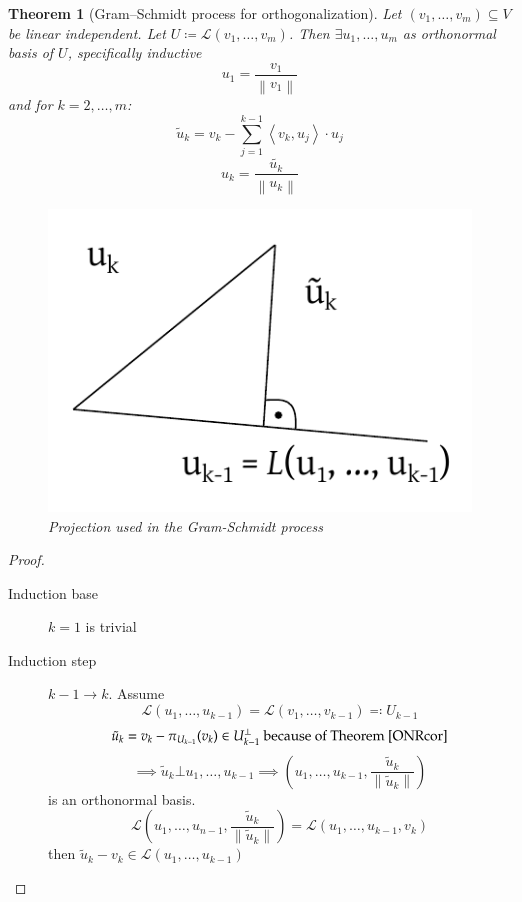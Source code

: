 \documentclass{article}
\newtheorem{theorem}{Theorem}  \numberwithin{theorem}{section}
\newcommand{\ip}[2]{\left\langle#1,#2\right\rangle} %
\newcommand{\norm}[1]{\left\|#1\right\|}
\begin{document}
\begin{theorem}[Gram–Schmidt process for orthogonalization] %
  Let $(v_1, \ldots, v_m) \subseteq V$ be linear independent.
  Let $U \coloneqq \mathcal L(v_1, \ldots, v_m)$.
  Then $\exists u_1, \ldots, u_m$ as orthonormal basis of $U$, specifically inductive
  \[ u_1 = \frac{v_1}{\norm{v_1}} \]
  and for $k = 2, \ldots, m$:
  \[ \tilde u_k = v_k - \sum_{j=1}^{k-1} \ip{v_k}{u_j} \cdot u_j \]
  \[ u_k = \frac{\tilde{u_k}}{\norm{u_k}} \]
  \begin{figure}[t]
    \begin{center}
      \includegraphics{img/12_GS_projection.pdf}
      \caption{Projection used in the Gram-Schmidt process}
      \label{GSproj}
    \end{center}
  \end{figure}
\end{theorem}

\begin{proof}
  \begin{description}
    \item[Induction base] $k=1$ is trivial
    \item[Induction step] $k-1 \to k$. Assume
      \[ \mathcal L(u_1, \ldots, u_{k-1}) = \mathcal L(v_1, \ldots, v_{k-1}) \eqqcolon U_{k-1} \]
      \[ \tilde u_k = v_k - \pi_{U_{k-1}}(v_k) \in U_{k-1}^\bot \text{ because of Theorem~\ref{ONRcor}} \]
      \[ \implies \tilde u_k \bot u_1, \ldots, u_{k-1} \implies (u_1, \ldots, u_{k-1}, \frac{\tilde u_k}{\norm{\tilde u_k}}) \]
      is an orthonormal basis.
      \[
        \mathcal L(u_1, \ldots, u_{n-1}, \frac{\tilde u_k}{\norm{\tilde u_k}})
          = \mathcal L(u_1, \ldots, u_{k-1}, v_k)
      \]
      then $\tilde u_k - v_k \in \mathcal L(u_1, \ldots, u_{k-1})$
  \end{description}
\end{proof}
\end{document}
